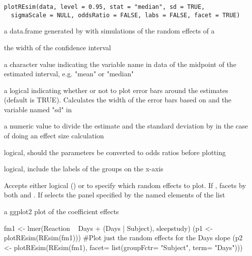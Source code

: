 \documentclass[letterpaper]{book}
\begin{document}
%
\begin{Usage}
\begin{verbatim}
plotREsim(data, level = 0.95, stat = "median", sd = TRUE,
  sigmaScale = NULL, oddsRatio = FALSE, labs = FALSE, facet = TRUE)
\end{verbatim}
\end{Usage}
%
\begin{Arguments}
\begin{ldescription}
\item[\code{data}] a data.frame generated by  with simulations of
the random effects of a 

\item[\code{level}] the width of the confidence interval

\item[\code{stat}] a character value indicating the variable name in data of the
midpoint of the estimated interval, e.g. "mean" or "median"

\item[\code{sd}] a logical indicating whether or not to plot error bars around
the estimates (default is TRUE). Calculates the width of the error bars
based on  and the variable named "sd" in 

\item[\code{sigmaScale}] a numeric value to divide the estimate and the standard
deviation by in the case of doing an effect size calculation

\item[\code{oddsRatio}] logical, should the parameters be converted to odds ratios
before plotting

\item[\code{labs}] logical, include the labels of the groups on the x-axis

\item[\code{facet}] Accepts either logical () or  to specify which
random effects to plot. If , facets by both  and .
If  selects the panel specified by the named elements of the list
\end{ldescription}
\end{Arguments}
%
\begin{Value}
a ggplot2 plot of the coefficient effects
\end{Value}
%
\begin{Examples}
\begin{ExampleCode}
 fm1 <- lmer(Reaction ~ Days + (Days | Subject), sleepstudy)
 (p1 <- plotREsim(REsim(fm1)))
 #Plot just the random effects for the Days slope
 (p2 <- plotREsim(REsim(fm1), facet= list(groupFctr= "Subject", term= "Days")))
\end{ExampleCode}
\end{Examples}
\end{document}

